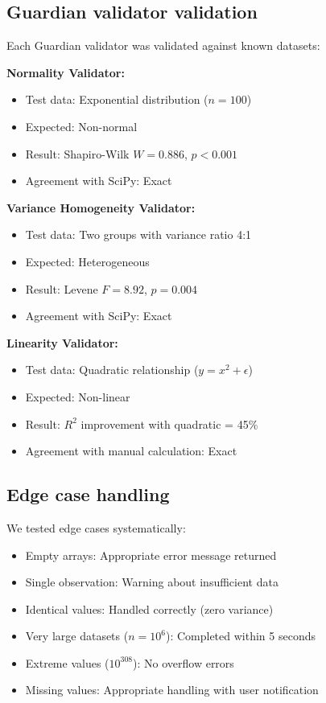 \documentclass[article]{jss}
\begin{document}
\subsection{Guardian validator validation}

Each Guardian validator was validated against known datasets:

\textbf{Normality Validator:}
\begin{itemize}
\item Test data: Exponential distribution ($n=100$)
\item Expected: Non-normal
\item Result: Shapiro-Wilk $W = 0.886$, $p < 0.001$
\item Agreement with SciPy: Exact
\end{itemize}

\textbf{Variance Homogeneity Validator:}
\begin{itemize}
\item Test data: Two groups with variance ratio 4:1
\item Expected: Heterogeneous
\item Result: Levene $F = 8.92$, $p = 0.004$
\item Agreement with SciPy: Exact
\end{itemize}

\textbf{Linearity Validator:}
\begin{itemize}
\item Test data: Quadratic relationship ($y = x^2 + \epsilon$)
\item Expected: Non-linear
\item Result: $R^2$ improvement with quadratic = 45\%
\item Agreement with manual calculation: Exact
\end{itemize}

\subsection{Edge case handling}

We tested edge cases systematically:

\begin{itemize}
\item Empty arrays: Appropriate error message returned
\item Single observation: Warning about insufficient data
\item Identical values: Handled correctly (zero variance)
\item Very large datasets ($n = 10^6$): Completed within 5 seconds
\item Extreme values ($10^{308}$): No overflow errors
\item Missing values: Appropriate handling with user notification
\end{itemize}
\end{document}
